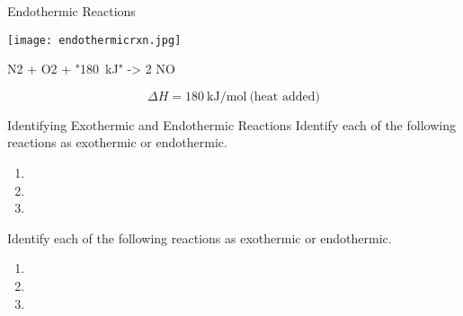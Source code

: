 \documentclass[notes=only]{beamer}
\begin{document}
\begin{frame}{Endothermic Reactions}
		\begin{center}
			\texttt{[image: endothermicrxn.jpg]}
		\end{center}
	\begin{reaction*}
		N2\gas{} + O2\gas{} + "\SI{180}{\kilo\joule}" -> 2
		NO\gas{}
	\end{reaction*}
	\begin{equation*}
		\Delta H = \SI{+180}{\kilo\joule\per\mole}~\text{(heat
		added)}
	\end{equation*}
\end{frame}

\begin{frame}[t]{Identifying Exothermic and Endothermic Reactions}
	Identify each of the following reactions as exothermic or endothermic.
	\begin{enumerate}
		\item {}
		\item {}
		\item {}
	\end{enumerate}
\end{frame}


\begin{onyourown}[0em]
	Identify each of the following reactions as exothermic or endothermic.
	\begin{enumerate}
		\item {}
		\item {}
		\item {}
	\end{enumerate}
\end{onyourown}
\end{document}

